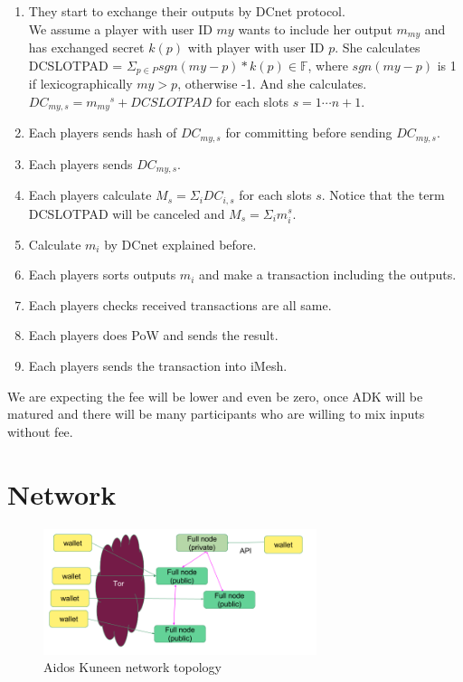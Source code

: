 \documentclass[a4paper,10pt,twocolumn]{article}
\begin{document}
\begin{enumerate}
	\item They start to exchange their outputs by DCnet protocol. \\
	We assume a player with user ID \(my\) wants to include her output \(m_{my} \) and has exchanged secret \(k(p)\) with player with user ID \(p\). 
	She calculates DCSLOTPAD = \( \Sigma_{p \in P} sgn (my-p) * k(p) \in \mathbb{F} \),
	where \(sgn(my-p)\) is 1 if lexicographically \(my > p\), otherwise -1. And she calculates. 
		 \(  DC_{my,s} = {m_{my}}^s + DCSLOTPAD \) for each slots \( s = 1 \cdots n+1 \).
	 \item Each players sends hash of \( DC_{my,s}\) for committing before sending \(DC_{my,s}\).
	 \item Each players sends  \( DC_{my,s}\).
	 \item Each players calculate \( M_s = \Sigma_{i} DC_{i,s} \) for each slots \(s\). Notice that the term  DCSLOTPAD  will be canceled
	and  \(M_s = \Sigma_{i} m_{i}^s \).
	\item Calculate \(m_{i}\) by DCnet explained before.
	\item Each players sorts outputs \(m_{i}\) and make a transaction including the outputs.
	\item Each players checks received transactions are all same.
	\item Each players does PoW and sends the result.
	\item Each players sends the transaction into iMesh.
\end{enumerate}

We are expecting the fee will be lower and even be zero, once ADK will be matured and there will be
many participants who are willing to mix inputs without fee.

	\section{Network}
	\label{sec:network}
	
	\begin{figure}[ht]
		\begin{center}
		\includegraphics[width=80mm]{network.png}
		  \caption{Aidos Kuneen network topology}
		\label{fig:network}
		\end{center}
	 \end{figure}
	
\end{document}
